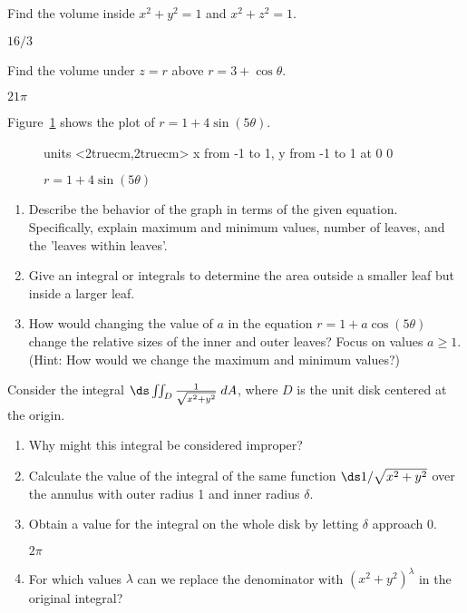\begin{enumialphparenastyle}
\begin{ex}
Find the volume inside
$x^2+y^2=1$ and $x^2+z^2=1$.
\begin{sol}
$16/3$
\end{sol}
\end{ex}

\begin{ex}
Find the volume under $z=r$ above $r=3+\cos\theta$.
\begin{sol}
$21\pi$
\end{sol}
\end{ex}

\begin{ex}
Figure~\ref{fig:doubleflower} shows the plot of
$r=1+4\sin(5\theta)$.
\begin{figure}[H]
\centerline{
\vbox{\beginpicture
\normalgraphs
\setcoordinatesystem units <2truecm,2truecm>
\setplotarea x from -1 to 1, y from -1 to 1
 at 0 0
\endpicture}}
\caption{$r=1+4\sin(5\theta)$}
\label{fig:doubleflower}
\end{figure}
\begin{enumerate}
	\item Describe the behavior of the graph in terms of the given
	  equation.  Specifically, explain maximum and minimum values, number
	  of leaves, and the 'leaves within leaves'.
	\item Give an integral or integrals to determine the area outside a
	  smaller leaf but inside a larger leaf.
	\item How would changing the value of $a$ in the equation
	  $r=1+a\cos(5\theta)$ change the relative sizes of the inner and
	  outer leaves? Focus on values $a\geq 1$.  (Hint: How would we change
	  the maximum and minimum values?)
\end{enumerate}
\end{ex}

\begin{ex}
Consider the integral $\ds\iint_D {1\over\sqrt{x^2+y^2}} \;
dA$, where $D$ is the unit disk centered at the origin.
\begin{enumerate}
	\item Why might this integral be considered improper?
	\item Calculate the value of the integral of the same function
	  $\ds 1/\sqrt{x^2+y^2}$ over the annulus with outer radius 1 and
	  inner radius $\delta$.
	\item Obtain a value for the integral on the whole disk by letting
	  $\delta$ approach 0.
		\begin{sol}
		$2\pi$
		\end{sol}
	\item For which values $\lambda$ can we replace the denominator with
	  $(x^2+y^2)^\lambda$ in the original integral?
\end{enumerate}
\end{ex}

\end{enumialphparenastyle}